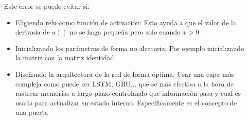 \begin{itemize}
    Este error se puede evitar si:
    \begin{itemize}
        \item Eligiendo \acrshort{relu} como función de activación: Esto ayuda a que el valor de la derivada de $a()$ no se haga pequeña pero solo cuando $x>0$.
        \item Inicializando los parámetros de forma no aleatoria: Por ejemplo inicializando la matriz con la matriz identidad.
        \item Diseñando la arquitectura de la red de forma óptima: Usar una capa más compleja como puede ser LSTM, GRU... que se más efectiva a la hora de rastrear memorias a largo plazo controlando que información pasa y cual es usada para actualizar su estado interno. Específicamente es el concepto de una puerta 
    \end{itemize}
\end{itemize}
